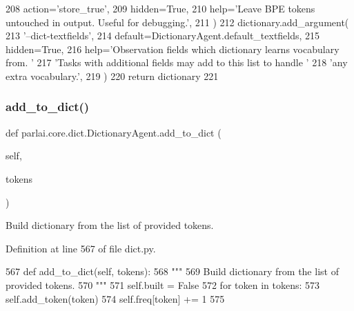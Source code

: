 \begin{DoxyCode}
208             action=\textcolor{stringliteral}{'store\_true'},
209             hidden=\textcolor{keyword}{True},
210             help=\textcolor{stringliteral}{'Leave BPE tokens untouched in output. Useful for debugging.'},
211         )
212         dictionary.add\_argument(
213             \textcolor{stringliteral}{'--dict-textfields'},
214             default=DictionaryAgent.default\_textfields,
215             hidden=\textcolor{keyword}{True},
216             help=\textcolor{stringliteral}{'Observation fields which dictionary learns vocabulary from. '}
217             \textcolor{stringliteral}{'Tasks with additional fields may add to this list to handle '}
218             \textcolor{stringliteral}{'any extra vocabulary.'},
219         )
220         \textcolor{keywordflow}{return} dictionary
221 
\end{DoxyCode}
\mbox{\label{classparlai_1_1core_1_1dict_1_1DictionaryAgent_acb28700c8c2725c05a8f3e28f11f8714}} 
\subsubsection{\texorpdfstring{add\+\_\+to\+\_\+dict()}{add\_to\_dict()}}
{\footnotesize\ttfamily def parlai.\+core.\+dict.\+Dictionary\+Agent.\+add\+\_\+to\+\_\+dict (\begin{DoxyParamCaption}\item[{}]{self,  }\item[{}]{tokens }\end{DoxyParamCaption})}

\begin{DoxyVerb}Build dictionary from the list of provided tokens.
\end{DoxyVerb}
 

Definition at line 567 of file dict.\+py.


\begin{DoxyCode}
567     \textcolor{keyword}{def }add\_to\_dict(self, tokens):
568         \textcolor{stringliteral}{"""}
569 \textcolor{stringliteral}{        Build dictionary from the list of provided tokens.}
570 \textcolor{stringliteral}{        """}
571         self.built = \textcolor{keyword}{False}
572         \textcolor{keywordflow}{for} token \textcolor{keywordflow}{in} tokens:
573             self.add\_token(token)
574             self.freq[token] += 1
575 
\end{DoxyCode}
\mbox{\label{classparlai_1_1core_1_1dict_1_1DictionaryAgent_aec44508e4b501214618e24d86a4a51df}} 

